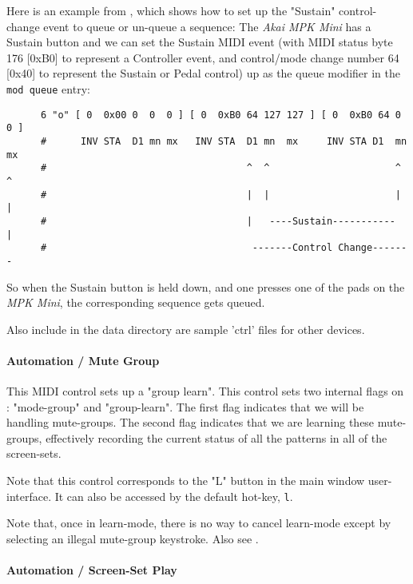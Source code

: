    Here is an example from \cite{midicontrol}, which shows how to set up
   the "Sustain" control-change event to queue or un-queue a sequence:
   The \textsl{Akai MPK Mini} has a Sustain button and we can set the
   Sustain MIDI event (with MIDI status byte 176 [0xB0] to represent a
   Controller event, and control/mode change number 64 [0x40] to
   represent the Sustain or Pedal control) up as the queue modifier in
   the \texttt{mod queue} entry:

   \begin{verbatim}
      6 "o" [ 0  0x00 0  0  0 ] [ 0  0xB0 64 127 127 ] [ 0  0xB0 64 0  0 ]
      #      INV STA  D1 mn mx   INV STA  D1 mn  mx     INV STA D1  mn mx
      #                                   ^  ^                      ^  ^
      #                                   |  |                      |  |
      #                                   |   ----Sustain-----------   |
      #                                    -------Control Change-------
   \end{verbatim}

   So when the Sustain button is held down, and one presses one of the pads
   on the \textsl{MPK Mini}, the corresponding sequence gets queued.

   Also include in the data directory are sample 'ctrl' files for other devices.

\paragraph{Automation / Mute Group}
\label{paragraph:configuration_midi_ctrl_modgmute}

   This MIDI control sets up a "group learn".
   This control sets two internal flags on : "mode-group" and "group-learn".
   The first flag indicates that we will be handling mute-groups.
   The second flag indicates that we are learning these mute-groups,
   effectively recording the current status of all the patterns in all of the
   screen-sets.

   Note that this control corresponds to the "L" button in the main window
   user-interface.
   It can also be accessed by the default hot-key, \texttt{l}.

   Note that, once in learn-mode, there is no way to cancel learn-mode
   except by selecting an illegal mute-group keystroke.
   Also see .

\paragraph{Automation / Screen-Set Play}
\label{paragraph:configuration_midi_ctrl_ssplay}

